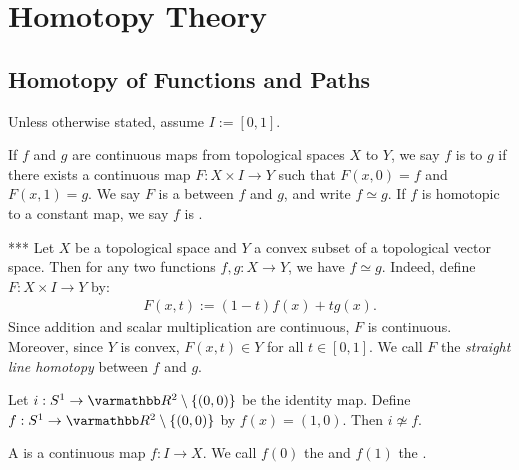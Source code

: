 \chapter{Homotopy Theory}

\section{Homotopy of Functions and Paths}

Unless otherwise stated, assume $I:=[0,1]$.

\begin{definition}
    If $f$ and $g$ are continuous maps from topological spaces $X$ to $Y$, we say $f$ is  to $g$ if there exists a continuous map $F:X \times I \rightarrow Y$ such that $F(x,0) = f$ and $F(x,1) = g$. We say $F$ is a  between $f$ and $g$, and write $f \simeq g$. If $f$ is homotopic to a constant map, we say $f$ is .
\end{definition}

\begin{example}{\color{red}***}
    Let $X$ be a topological space and $Y$ a convex subset of a topological vector space. Then for any two functions $f,g:X \rightarrow Y$, we have $f \simeq g$. Indeed, define $F:X \times I \rightarrow Y$ by:
        \begin{equation*}
        \begin{split}
            F(x,t) := (1-t)f(x) + tg(x).
        \end{split}
        \end{equation*}
    Since addition and scalar multiplication are continuous, $F$ is continuous. Moreover, since $Y$ is convex, $F(x,t) \in Y$ for all $t \in [0,1]$. We call $F$ the \textit{straight line homotopy} between $f$ and $g$.
\end{example}

\begin{example}
    Let $i:S^1 \rightarrow \bfR^2 \setminus \{(0,0)\}$ be the identity map. Define $f:S^1 \rightarrow \bfR^2 \setminus \{(0,0)\}$ by $f(x) = (1,0)$. Then $i \not\simeq f$.
\end{example}

\begin{definition}
    A  is a continuous map $f:I \rightarrow X$. We call $f(0)$ the  and $f(1)$ the .
\end{definition}

